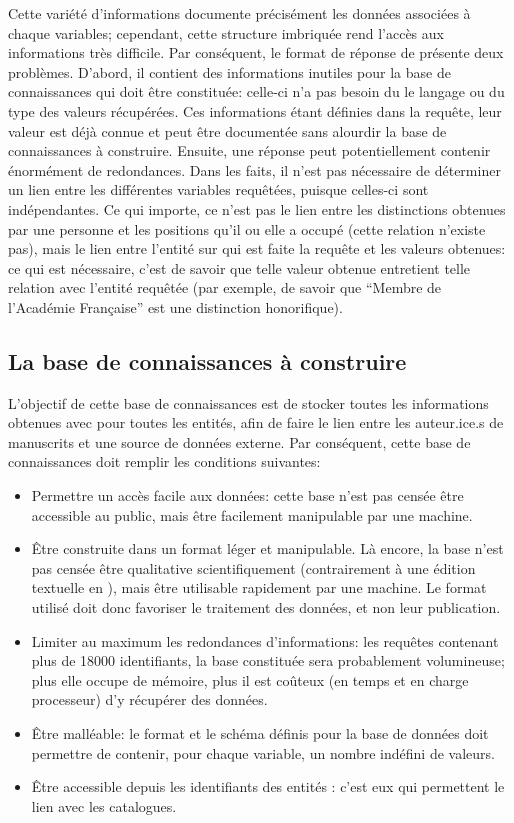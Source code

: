 Cette variété d'informations documente précisément les données associées à chaque variables; cependant, cette structure imbriquée rend l'accès aux informations très difficile. Par conséquent, le format de réponse de \sparql{} présente deux problèmes. D'abord, il contient des informations inutiles pour la base de connaissances qui doit être constituée: celle-ci n'a pas besoin du le langage ou du type des valeurs récupérées. Ces informations étant définies dans la requête, leur valeur est déjà connue et peut être documentée sans alourdir la base de connaissances à construire. Ensuite, une réponse \sparql{} peut potentiellement contenir énormément de redondances. Dans les faits, il n'est pas nécessaire de déterminer un lien entre les différentes variables requêtées, puisque celles-ci sont indépendantes. Ce qui importe, ce n'est pas le lien entre les distinctions obtenues par une personne et les positions qu'il ou elle a occupé (cette relation n'existe pas), mais le lien entre l'entité \wkd{} sur qui est faite la requête et les valeurs obtenues: ce qui est nécessaire, c'est de savoir que telle valeur obtenue entretient telle relation avec l'entité requêtée (par exemple, de savoir que \enquote{Membre de l'Académie Française} est une distinction honorifique).

\subsection{La base de connaissances à construire}
L'objectif de cette base de connaissances est de stocker toutes les informations obtenues avec \sparql{} pour toutes les entités, afin de faire le lien entre les auteur.ice.s de manuscrits et une source de données externe. Par conséquent, cette base de connaissances doit remplir les conditions suivantes:

\begin{itemize}
	\item Permettre un accès facile aux données: cette base n'est pas censée être accessible au public, mais être facilement manipulable par une machine.
	\item Être construite dans un format léger et manipulable. Là encore, la base n'est pas censée être qualitative scientifiquement (contrairement à une édition textuelle en \tei{}), mais être utilisable rapidement par une machine. Le format utilisé doit donc favoriser le traitement des données, et non leur publication.
	\item Limiter au maximum les redondances d'informations: les requêtes contenant plus de 18000 identifiants, la base constituée sera probablement volumineuse; plus elle occupe de mémoire, plus il est coûteux (en temps et en charge processeur) d'y récupérer des données.
	\item Être malléable: le format et le schéma définis pour la base de données doit permettre de contenir, pour chaque variable, un nombre indéfini de valeurs.
	\item Être accessible depuis les identifiants des entités \wkd{}: c'est eux qui permettent le lien avec les catalogues.
\end{itemize}

